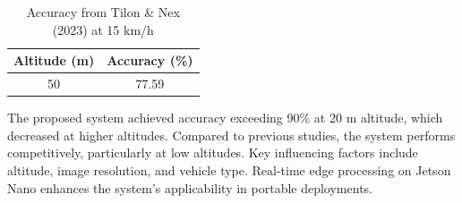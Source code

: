 \begin{table}[htbp]
\centering
\caption{Accuracy from Tilon \& Nex (2023) at 15 km/h}
\label{table:accuracy_tilon}
\begin{tabular}{|c|c|}
\hline
\textbf{Altitude (m)} & Accuracy (\%) \\ \hline
50 & 77.59 \\ \hline
\end{tabular}
\end{table}

The proposed system achieved accuracy exceeding 90\% at 20 m altitude, which decreased at higher altitudes. Compared to previous studies, the system performs competitively, particularly at low altitudes. Key influencing factors include altitude, image resolution, and vehicle type. Real-time edge processing on Jetson Nano enhances the system’s applicability in portable deployments.


